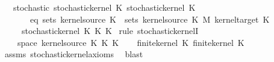 \begin{isabellebody}
\ \ \ stochastic{\isacharcolon}{\kern0pt}\ {\isachardoublequoteopen}stochastic{\isacharunderscore}{\kern0pt}kernel\ K{\isacharunderscore}{\kern0pt}{}{\isachardoublequoteclose}\ {\isachardoublequoteopen}stochastic{\isacharunderscore}{\kern0pt}kernel\ K{\isacharunderscore}{\kern0pt}{}{\isachardoublequoteclose}\isanewline
\ \ \ \ \ \ \ eq{\isacharcolon}{\kern0pt}\ {\isachardoublequoteopen}sets\ {\isacharparenleft}{\kern0pt}kernel{\isacharunderscore}{\kern0pt}source\ K{\isacharunderscore}{\kern0pt}{}{\isacharparenright}{\kern0pt}\ {\isacharequal}{\kern0pt}\ sets\ {\isacharparenleft}{\kern0pt}kernel{\isacharunderscore}{\kern0pt}source\ K{\isacharunderscore}{\kern0pt}{}\ {\isasymOtimes}\isactrlsub M\ kernel{\isacharunderscore}{\kern0pt}target\ K{\isacharunderscore}{\kern0pt}{}{\isacharparenright}{\kern0pt}{\isachardoublequoteclose}\isanewline
\ \ \ \ \ {\isachardoublequoteopen}stochastic{\isacharunderscore}{\kern0pt}kernel\ {\isacharparenleft}{\kern0pt}K{\isacharunderscore}{\kern0pt}{}\ {\isasymOtimes}\isactrlsub K\ K{\isacharunderscore}{\kern0pt}{}{\isacharparenright}{\kern0pt}{\isachardoublequoteclose}\isanewline
%
\isadelimproof
%
\endisadelimproof
%
\isatagproof
{}\isamarkupfalse%
\ {\isacharparenleft}{\kern0pt}rule\ stochastic{\isacharunderscore}{\kern0pt}kernelI{\isacharparenright}{\kern0pt}\isanewline
\ \ \isamarkupfalse%
\ {\isasymomega}\ \isamarkupfalse%
\ {\isacharasterisk}{\kern0pt}{\isacharcolon}{\kern0pt}\ {\isachardoublequoteopen}{\isasymomega}\ {\isasymin}\ space\ {\isacharparenleft}{\kern0pt}kernel{\isacharunderscore}{\kern0pt}source\ {\isacharparenleft}{\kern0pt}K{\isacharunderscore}{\kern0pt}{}\ {\isasymOtimes}\isactrlsub K\ K{\isacharunderscore}{\kern0pt}{}{\isacharparenright}{\kern0pt}{\isacharparenright}{\kern0pt}{\isachardoublequoteclose}\isanewline
\ \ \isamarkupfalse%
\ {\isachardoublequoteopen}finite{\isacharunderscore}{\kern0pt}kernel\ K{\isacharunderscore}{\kern0pt}{}{\isachardoublequoteclose}\ {\isachardoublequoteopen}finite{\isacharunderscore}{\kern0pt}kernel\ K{\isacharunderscore}{\kern0pt}{}{\isachardoublequoteclose}\isanewline
\ \ \ \ \isamarkupfalse%
\ assms\ stochastic{\isacharunderscore}{\kern0pt}kernel{\isachardot}{\kern0pt}axioms{\isacharparenleft}{\kern0pt}{}{\isacharparenright}{\kern0pt}\ \isamarkupfalse%
\ blast{\isacharplus}{\kern0pt}\isanewline

\end{isabellebody}
